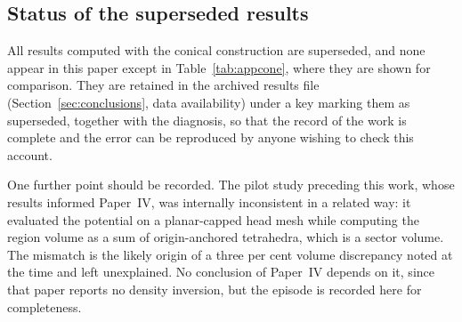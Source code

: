 \subsection{Status of the superseded results}
\label{app:cone:status}

All results computed with the conical construction are superseded, and none
appear in this paper except in Table~\ref{tab:appcone}, where they are shown
for comparison. They are retained in the archived results file
(Section~\ref{sec:conclusions}, data availability) under a key marking them as
superseded, together with the diagnosis, so that the record of the work is
complete and the error can be reproduced by anyone wishing to check this
account.

One further point should be recorded. The pilot study preceding this work,
whose results informed Paper~IV, was internally inconsistent in a related way:
it evaluated the potential on a planar-capped head mesh while computing the
region volume as a sum of origin-anchored tetrahedra, which is a sector volume.
The mismatch is the likely origin of a three per cent volume discrepancy noted
at the time and left unexplained. No conclusion of Paper~IV depends on it,
since that paper reports no density inversion, but the episode is recorded here
for completeness.


